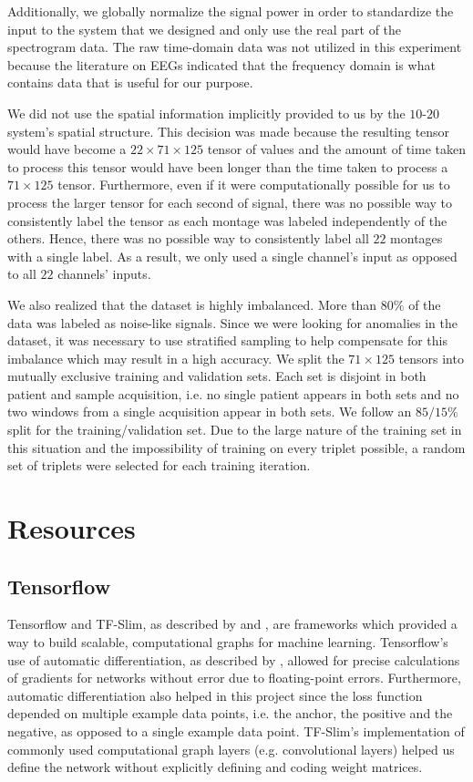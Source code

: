 Additionally, we globally normalize the signal power in order to standardize the input to the system that we designed and only use the real part of the spectrogram data. The raw time-domain data was not utilized in this experiment because the literature \cite{eegs_info, eeg_info2, mayo_eegs} on EEGs indicated that the frequency domain is what contains data that is useful for our purpose.

We did not use the spatial information implicitly provided to us by the $10$-$20$ system's spatial structure. This decision was made because the resulting tensor would have become a $22 \times 71 \times 125$ tensor of values and the amount of time taken to process this tensor would have been longer than the time taken to process a $71 \times 125$ tensor. Furthermore, even if it were computationally possible for us to process the larger tensor for each second of signal, there was no possible way to consistently label the tensor as each montage was labeled independently of the others. Hence, there was no possible way to consistently label all $22$ montages with a single label. As a result, we only used a single channel's input as opposed to all $22$ channels' inputs. 

We also realized that the dataset is highly imbalanced. More than $80\%$ of the data was labeled as noise-like signals. Since we were looking for anomalies in the dataset, it was necessary to use stratified sampling to help compensate for this imbalance which may result in a high accuracy. We split the $71 \times 125$ tensors into mutually exclusive training and validation sets. Each set is disjoint in both patient and sample acquisition, i.e. no single patient appears in both sets and no two windows from a single acquisition appear in both sets. We follow an $85/15\%$ split for the training/validation set. Due to the large nature of the training set in this situation and the impossibility of training on every triplet possible, a random set of triplets were selected for each training iteration. 

\section{Resources}


\subsection*{Tensorflow}

Tensorflow and TF-Slim, as described by \citet{tensorflow} and \citet{tfslim},  are frameworks which provided a way to build scalable, computational graphs for machine learning. Tensorflow's use of automatic differentiation, as described by \citet{autodiff}, allowed for precise calculations of gradients for networks without error due to floating-point errors. Furthermore, automatic differentiation also helped in this project since the loss function depended on multiple example data points, i.e. the anchor, the positive and the negative,  as opposed to a single example data point. TF-Slim's implementation of commonly used computational graph layers (e.g. convolutional layers) helped us define the network without explicitly defining and coding weight matrices. 

